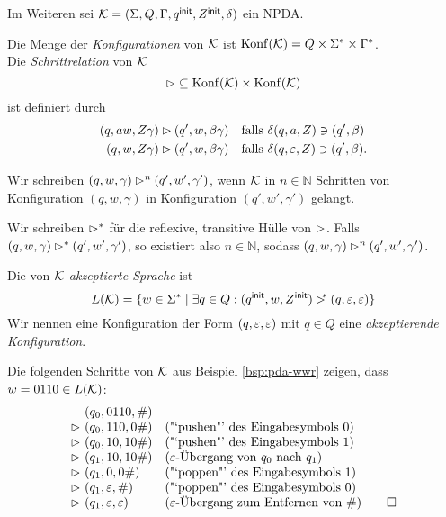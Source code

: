 Im Weiteren sei $\mathcal{K}=(\Sigma,Q,\Gamma,q^\mathsf{init},Z^\mathsf{init},\delta)$ ein \ac{NPDA}.
\begin{Def}[name={[Menge der Konfigurationen eines \acs*{NPDA}]}]
        Die Menge der \emph{Konfigurationen} von $\mathcal{K}$ ist $\operatorname{Konf}(\mathcal{K}) = Q\times\Sigma^*\times\Gamma^*$.\\
        Die \emph{Schrittrelation} von $\mathcal{K}$
  \begin{displaymath}
    \mathop{\rhd} \subseteq \operatorname{Konf}(\mathcal{K}) \times \operatorname{Konf}(\mathcal{K}) 
  \end{displaymath}
  ist definiert durch
        \begin{align*}
                (q,aw,Z\gamma) &\rhd (q',w,\beta\gamma) &&\text{falls }\delta(q,a,Z)\ni(q',\beta)\\
                (q,w,Z\gamma) &\rhd (q',w,\beta\gamma) &&\text{falls }\delta(q,\varepsilon,Z)\ni(q',\beta).
        \end{align*}

  Wir schreiben $(q,w,\gamma) \rhd^n (q',w',\gamma')$, wenn $\mathcal{K}$ in $n \in \mathbb{N}$ Schritten von Konfiguration $(q,w,\gamma)$ in Konfiguration $(q',w',\gamma')$ gelangt.

  Wir schreiben ${\rhd^*}$ für die reflexive, transitive Hülle von ${\rhd}$.
  Falls $(q,w,\gamma) \rhd^* (q',w',\gamma')$, so existiert also $n \in \mathbb{N}$, sodass $(q,w,\gamma) \rhd^n (q',w',\gamma')$.
  
        Die von $\mathcal{K}$ \emph{akzeptierte Sprache} ist
  \begin{displaymath}
                L(\mathcal{K}) = \{ w\in\Sigma^* \mid \exists q\in Q: (q^\mathsf{init},w,Z^\mathsf{init}) \rhd^{\!\!*} (q,\varepsilon,\varepsilon) \}
  \end{displaymath}
  Wir nennen eine Konfiguration der Form $(q,\varepsilon,\varepsilon)$ mit $q\in Q$ eine \emph{akzeptierende Konfiguration}.
\end{Def}

\begin{Bsp*}
  Die folgenden Schritte von $\mathcal{K}$ aus Beispiel \ref{bsp:pda-wwr} zeigen, dass $w = 0110 \in L(\mathcal{K})$:
  \begin{displaymath}
  \begin{array}{r@{\ }ll}
    & (q_0, 0110, \#) \\
    \ConfRel & (q_0, 110, 0\#)  &\text{("`pushen"' des Eingabesymbols $0$)}\\
    \ConfRel & (q_0, 10, 10\#)  &\text{("`pushen"' des Eingabesymbols $1$)}\\
    \ConfRel & (q_1, 10, 10\#)  &\text{($\Eps$-Übergang von $q_0$ nach $q_1$)} \\
    \ConfRel & (q_1, 0, 0\#)  &\text{("`poppen"' des Eingabesymbols $1$)}\\
    \ConfRel & (q_1,\Eps, \#) &\text{("`poppen"' des Eingabesymbols $0$)}\\
    \ConfRel & (q_1, \Eps, \Eps) &\text{($\Eps$-Übergang zum Entfernen von $\#$)}
    \qedhere
  \end{array}
\end{displaymath}
\end{Bsp*}

